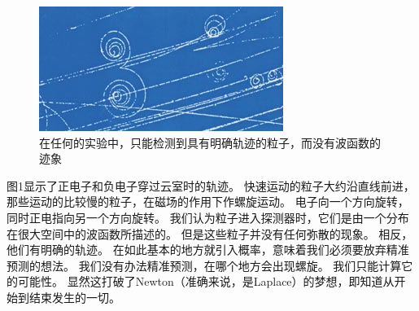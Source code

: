 \begin{figure}[h]
    \centering
    \includegraphics{img/1.jpg}
    \caption{在任何的实验中，只能检测到具有明确轨迹的粒子，而没有波函数的迹象}
\end{figure}\par
图1显示了正电子和负电子穿过云室时的轨迹。 快速运动的粒子大约沿直线前进， 那些运动的比较慢的粒子，在磁场的作用下作螺旋运动。 电子向一个方向旋转，同时正电指向另一个方向旋转。 我们认为粒子进入探测器时，它们是由一个分布在很大空间中的波函数所描述的。 但是这些粒子并没有任何弥散的现象。 相反，他们有明确的轨迹。
在如此基本的地方就引入概率，意味着我们必须要放弃精准预测的想法。 我们没有办法精准预测，在哪个地方会出现螺旋。 我们只能计算它的可能性。 显然这打破了Newton（准确来说，是Laplace）的梦想，即知道从开始到结束发生的一切。\par
